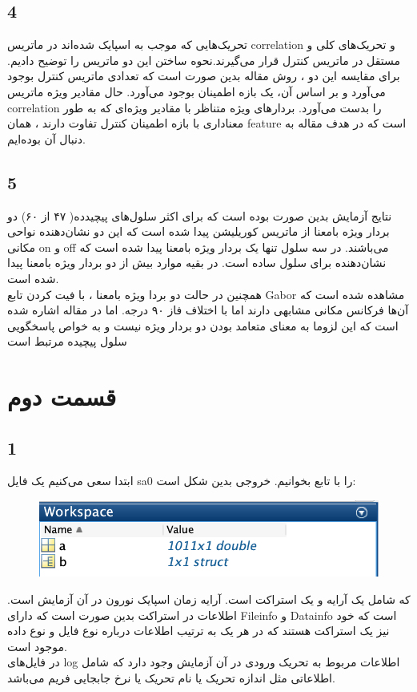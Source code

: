\documentclass[12 pt]{article}
\begin{document}
 \subsection*{4}
 تحریک‌هایی که موجب به اسپایک شده‌اند در ماتریس correlation و تحریک‌های کلی و مستقل در ماتریس کنترل قرار می‌گیرند.نحوه ساختن این دو ماتریس را توضیح دادیم. برای مقایسه این دو ، روش مقاله بدین صورت است که تعدادی ماتریس کنترل بوجود می‌آورد و بر اساس آن، یک بازه اطمینان بوجود می‌آورد. حال مقادیر ویژه ماتریس correlation را بدست می‌آورد. بردارهای ویژه متناظر با مقادیر ویژه‌ای که به طور معناداری با بازه اطمینان کنترل تفاوت دارند ، همان feature است که در هدف مقاله به دنبال آن بوده‌ایم.
 \subsection*{5}
 نتایج آزمایش بدین صورت بوده است که برای اکثر سلول‌های پیچیدده( ۴۷ از ۶۰) دو بردار ویژه بامعنا از ماتریس کوریلیشن پیدا شده است که این دو نشان‌دهنده نواحی مکانی on و off
 می‌باشند. در سه سلول تنها یک بردار ویژه بامعنا پیدا شده است که نشان‌دهنده 
 برای سلول ساده است. در بقیه موارد بیش از دو بردار ویژه بامعنا پیدا شده است.\\
 همچنین در حالت دو بردا ویژه بامعنا ، با فیت کردن تابع Gabor مشاهده شده است که آن‌ها فرکانس مکانی مشابهی دارند اما با اختلاف فاز ۹۰ درجه. اما در مقاله اشاره شده است که این لزوما به معنای متعامد بودن دو بردار ویژه نیست و به خواص پاسخگویی سلول پیچیده مرتبط است
 \section*{قسمت دوم}
 \subsection*{1}
 ابتدا سعی می‌کنیم یک فایل sa0 را با تابع 
 بخوانیم. خروجی بدین شکل است:
 		\begin{figure}[H]
 	\centering
 	\includegraphics[height=0.2\linewidth, width = 0.5\linewidth]{b.png}
 \end{figure}
که شامل یک آرایه و یک استراکت است. آرایه زمان اسپایک نورون در آن آزمایش است. اطلاعات در استراکت بدین صورت است که دارای Fileinfo  و Datainfo است که خود نیز یک استراکت هستند که در هر یک به ترتیب اطلاعات درباره نوع فایل و نوع داده موجود است. \\
در فایل‌های log اطلاعات مربوط به تحریک ورودی در آن آزمایش وجود دارد که شامل اطلاعاتی مثل اندازه تحریک یا نام تحریک یا نرخ جابجایی فریم می‌باشد.
\end{document}
